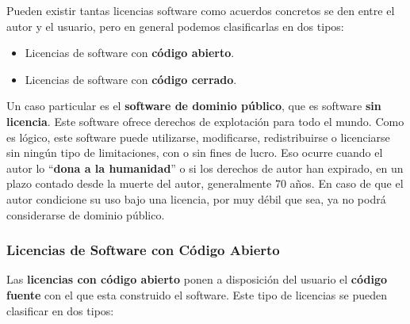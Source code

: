 Pueden existir tantas licencias software como acuerdos concretos se den entre el autor y el usuario, pero en general podemos clasificarlas en dos tipos:

\begin{itemize}
    \item Licencias de software con \textbf{código abierto}.
    \item Licencias de software con \textbf{código cerrado}.
\end{itemize}

Un caso particular es el \textbf{software de dominio público}, que es software \textbf{sin licencia}. Este software ofrece derechos de explotación para todo el mundo. Como es lógico, este software puede utilizarse, modificarse, redistribuirse o licenciarse sin ningún tipo de limitaciones, con o sin fines de lucro. Eso ocurre cuando el autor lo ``\textbf{dona a la humanidad}'' o si los derechos de autor han expirado, en un plazo contado desde la muerte del autor, generalmente 70 años. En caso de que el autor condicione su uso bajo una licencia, por muy débil que sea, ya no podrá considerarse de dominio público.

\subsubsection{Licencias de Software con Código Abierto}
Las \textbf{licencias con código abierto} ponen a disposición del usuario el \textbf{código fuente} con el que esta construido el software. Este tipo de licencias se pueden clasificar en dos tipos:

